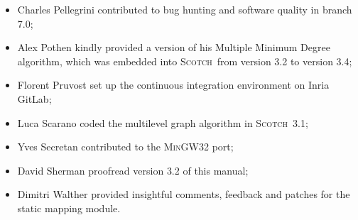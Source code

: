 \documentclass{article}
\newcommand{\scotch}{\textsc{Scotch}}               %
\begin{document}
\begin{itemize}
\item
Charles Pellegrini contributed to bug hunting and software quality in
branch \textsc{7.0};
\item
Alex Pothen kindly provided a version of his Multiple Minimum Degree
algorithm, which was embedded into \scotch\ from version \textsc{3.2} to
version \textsc{3.4};
\item
Florent Pruvost set up the continuous integration environment on
Inria GitLab;
\item
Luca Scarano coded the multilevel graph algorithm in
\scotch\ \textsc{3.1};
\item
Yves Secretan contributed to the \textsc{MinGW32} port;
\item
David Sherman proofread version \textsc{3.2} of this manual;
\item
Dimitri Walther provided insightful comments, feedback and patches for
the static mapping module.
\end{itemize}




\end{document}
